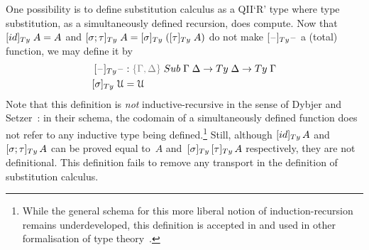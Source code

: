 \documentclass[a4paper,UKenglish,numberwithinsect,cleveref,thm-restate]{lipics-v2021}
\begin{document}
One possibility is to define substitution calculus as a QII`R' type where type substitution, as a simultaneously defined recursion, does compute.
Now that $[ \idS ]_{\Ty}\;A = A$ and $[ \sigma ; \tau ]_{\Ty}\;A = [ \sigma ]_{\Ty}\;([ \tau ]_{\Ty}\;A)$ do not make $[\blank]_{\Ty}\blank$ a (total) function, we may define it by
\begin{alignat*}{3}
[\blank]_{\Ty} \blank &: \implicit{\Gamma, \Delta} \; \Sub\;\Gamma\;\Delta \to \Ty\;\Delta \to \Ty\;\Gamma \\
[ \sigma ]_{\Ty}\;\UU & = \UU
\end{alignat*}
Note that this definition is \emph{not} inductive-recursive in the sense of Dybjer and Setzer~\cite{Dybjer2000,Dybjer2003}: in their schema, the codomain of a simultaneously defined function does not refer to any inductive type being defined.\footnote{%
  While the general schema for this more liberal notion of induction-recursion remains underdeveloped, this definition is accepted in \Agda and used in other formalisation of type theory~\cite{Danielsson2006}.}
Still, although $[\idS]_{\Ty}\,A$ and $[\sigma; \tau]_{\Ty}\,A$ can be proved equal to~$A$ and~$[\sigma]_{\Ty}\,[\tau]_{\Ty}\,A$ respectively, they are not definitional.
This definition fails to remove any transport in the definition of substitution calculus.
\end{document}
